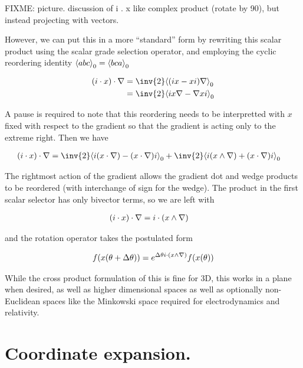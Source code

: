 FIXME: picture.  discussion of i . x like complex product (rotate by 90), but instead projecting with vectors.

However, we can put this in a more ``standard'' form by rewriting this scalar product using the scalar grade selection operator, and employing the cyclic reordering identity ${\left\langle{{ a b c }}\right\rangle}_{0} = {\left\langle{{ b c a}}\right\rangle}_{0}$

\begin{align*}
( i \cdot x) \cdot \grad
&=
\inv{2} \gpgradezero{ ( i x - x i) \grad } \\
&=
\inv{2} \gpgradezero{ i x \grad - \grad x i } \\
\end{align*}

A pause is required to note that this reordering needs to be interpretted with $x$ fixed with respect to the gradient so that the gradient is acting only to the extreme right.  Then we have

\begin{align}\label{eqn:rotationGen:foo17}
( i \cdot x) \cdot \grad
&=
\inv{2} \gpgradezero{ i (x \cdot \grad) - (x \cdot \grad) i } + \inv{2} \gpgradezero{ i (x \wedge \grad) + (x \cdot \grad) i } 
\end{align}

The rightmost action of the gradient allows the gradient dot and wedge products to be reordered (with interchange of sign for the wedge).  The product in the first scalar selector has only bivector terms, so we are left with

\begin{align}\label{eqn:rotationGen:foo18}
( i \cdot x) \cdot \nabla
&=
i \cdot (x \wedge \nabla)
\end{align}

and the rotation operator takes the postulated form

\begin{align}\label{eqn:rotationGen:foo19}
f(x(\theta + \Delta\theta)) = e^{\Delta\theta i \cdot (x \wedge \nabla)} f(x(\theta))
\end{align}

While the cross product formulation of this is fine for 3D, this works in a plane when desired, as well as higher dimensional spaces as well as optionally non-Euclidean spaces like the Minkowski space required for electrodynamics and relativity.

\section{Coordinate expansion.}

